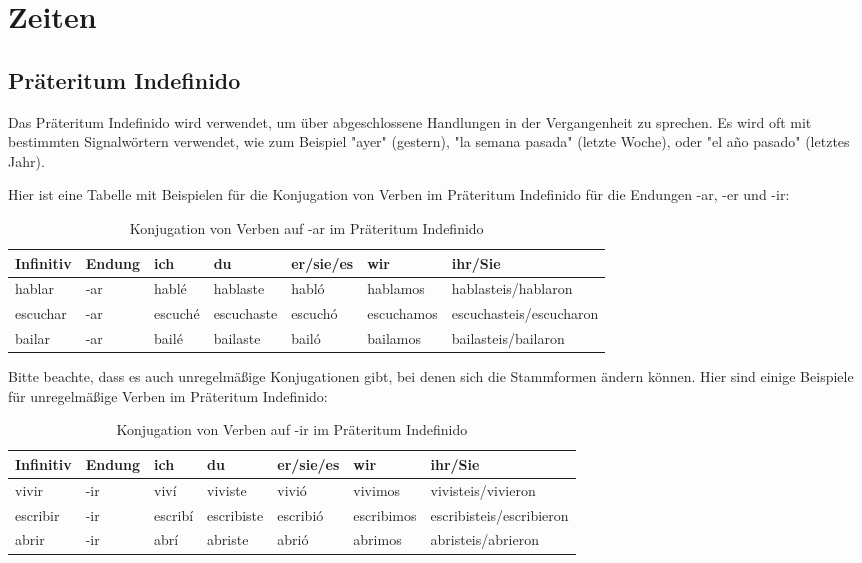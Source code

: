 \documentclass{article}
\begin{document}
\section{Zeiten}
\subsection{Präteritum Indefinido}
Das Präteritum Indefinido wird verwendet, um über abgeschlossene Handlungen in
der Vergangenheit zu sprechen. Es wird oft mit bestimmten Signalwörtern
verwendet, wie zum Beispiel "ayer" (gestern), "la semana pasada" (letzte
Woche), oder "el año pasado" (letztes Jahr).

Hier ist eine Tabelle mit Beispielen für die Konjugation von Verben im
Präteritum Indefinido für die Endungen -ar, -er und -ir:

\begin{table}[htb]
\centering
\caption{Konjugation von Verben auf -ar im Präteritum Indefinido}
\begin{tabular}{@{}lllllll@{}}
\toprule
\textbf{Infinitiv} & \textbf{Endung} & \textbf{ich} & \textbf{du} & \textbf{er/sie/es} & \textbf{wir} & \textbf{ihr/Sie} \\
\midrule
hablar & -ar & hablé & hablaste & habló & hablamos & hablasteis/hablaron \\
escuchar & -ar & escuché & escuchaste & escuchó & escuchamos & escuchasteis/escucharon \\
bailar & -ar & bailé & bailaste & bailó & bailamos & bailasteis/bailaron \\
\bottomrule
\end{tabular}
\end{table}

Bitte beachte, dass es auch unregelmäßige Konjugationen gibt, bei denen sich
die Stammformen ändern können. Hier sind einige Beispiele für unregelmäßige
Verben im Präteritum Indefinido:

\begin{table}[htb]
\centering
\caption{Konjugation von Verben auf -ir im Präteritum Indefinido}
\begin{tabular}{@{}lllllll@{}}
\toprule
\textbf{Infinitiv} & \textbf{Endung} & \textbf{ich} & \textbf{du} & \textbf{er/sie/es} & \textbf{wir} & \textbf{ihr/Sie} \\
\midrule
vivir & -ir & viví & viviste & vivió & vivimos & vivisteis/vivieron \\
escribir & -ir & escribí & escribiste & escribió & escribimos & escribisteis/escribieron \\
abrir & -ir & abrí & abriste & abrió & abrimos & abristeis/abrieron \\
\bottomrule
\end{tabular}
\end{table}
\end{document}
